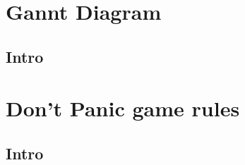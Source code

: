 
\appendix
\renewcommand{\thesection}{\arabic{section}}

\chapter{Gannt Diagram}
\section{Intro}\label{appsec:intro}





\chapter{Don't Panic game rules}
\section{Intro}\label{appsec:intro}




